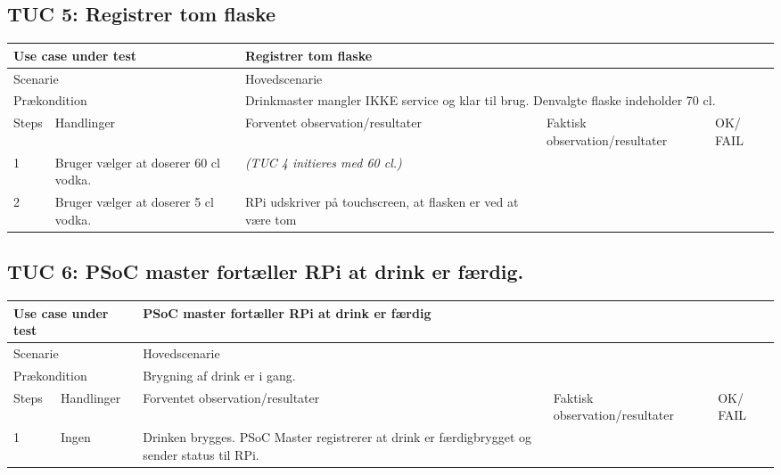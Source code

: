 \subsection{TUC 5: Registrer tom flaske}

\begin{table}[H]
\begin{tabular}{|p{1cm}|p{4cm}|p{4cm}|p{4cm}|p{1cm}|}
\hline
\multicolumn{2}{|p{5cm}|}{Use case under test} & \multicolumn{3}{p{9cm}|}{Registrer tom flaske}                                       \\ \hline
\multicolumn{2}{|p{5cm}|}{Scenarie}            & \multicolumn{3}{p{9cm}|}{Hovedscenarie}                                          \\ \hline
\multicolumn{2}{|p{5cm}|}{Prækondition}        & \multicolumn{3}{p{9cm}|}{Drinkmaster mangler IKKE service og klar til brug. Denvalgte flaske indeholder 70 cl.}                                 \\ \hline
Steps               & Handlinger          & Forventet observation/resultater & Faktisk observation/resultater & OK/ FAIL \\ \hline
1    & Bruger vælger at doserer 60 cl vodka.  &  \textit{(TUC 4 initieres med 60 cl.)} &   &         \\ \hline
2   & Bruger vælger at doserer 5 cl vodka. & RPi udskriver på touchscreen, at flasken er ved at være tom &    &   \\ \hline

\end{tabular}
\end{table}

\subsection{TUC 6: PSoC master fortæller RPi at drink er færdig.}

\begin{table}[H]
\begin{tabular}{|p{1cm}|p{4cm}|p{4cm}|p{4cm}|p{1cm}|}
\hline
\multicolumn{2}{|p{5cm}|}{Use case under test} & \multicolumn{3}{p{9cm}|}{PSoC master fortæller RPi at drink er færdig}                                       \\ \hline
\multicolumn{2}{|p{5cm}|}{Scenarie}            & \multicolumn{3}{p{9cm}|}{Hovedscenarie}                                          \\ \hline
\multicolumn{2}{|p{5cm}|}{Prækondition}        & \multicolumn{3}{p{9cm}|}{Brygning af drink er i gang.}                                 \\ \hline
Steps               & Handlinger          & Forventet observation/resultater & Faktisk observation/resultater & OK/ FAIL \\ \hline
1    & Ingen  &   Drinken brygges. PSoC Master registrerer at drink er færdigbrygget og sender status til RPi. &   &         \\ \hline

\end{tabular}
\end{table}
